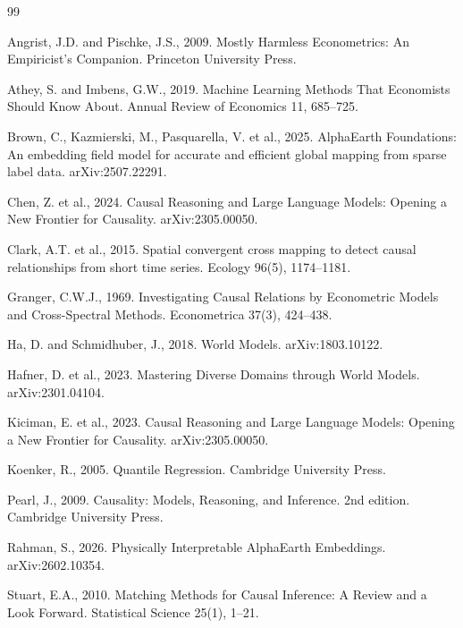 \documentclass{article}
\begin{document}
\begin{thebibliography}{99}

Angrist, J.D. and Pischke, J.S., 2009. Mostly Harmless Econometrics: An Empiricist's Companion. Princeton University Press.

Athey, S. and Imbens, G.W., 2019. Machine Learning Methods That Economists Should Know About. Annual Review of Economics 11, 685--725.

Brown, C., Kazmierski, M., Pasquarella, V. et al., 2025. AlphaEarth Foundations: An embedding field model for accurate and efficient global mapping from sparse label data. arXiv:2507.22291.

Chen, Z. et al., 2024. Causal Reasoning and Large Language Models: Opening a New Frontier for Causality. arXiv:2305.00050.

Clark, A.T. et al., 2015. Spatial convergent cross mapping to detect causal relationships from short time series. Ecology 96(5), 1174--1181.

Granger, C.W.J., 1969. Investigating Causal Relations by Econometric Models and Cross-Spectral Methods. Econometrica 37(3), 424--438.

Ha, D. and Schmidhuber, J., 2018. World Models. arXiv:1803.10122.

Hafner, D. et al., 2023. Mastering Diverse Domains through World Models. arXiv:2301.04104.

Kiciman, E. et al., 2023. Causal Reasoning and Large Language Models: Opening a New Frontier for Causality. arXiv:2305.00050.

Koenker, R., 2005. Quantile Regression. Cambridge University Press.

Pearl, J., 2009. Causality: Models, Reasoning, and Inference. 2nd edition. Cambridge University Press.

Rahman, S., 2026. Physically Interpretable AlphaEarth Embeddings. arXiv:2602.10354.

Stuart, E.A., 2010. Matching Methods for Causal Inference: A Review and a Look Forward. Statistical Science 25(1), 1--21.


\end{thebibliography}
\end{document}
